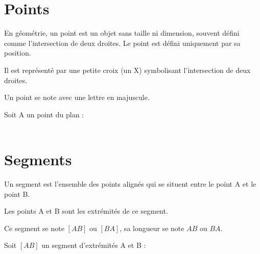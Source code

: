 \documentclass[11pt]{article}
\begin{document}
\section{Points}
\begin{definition}
  En géométrie, un point est un objet sans taille ni dimension, souvent défini comme l'intersection de deux droites. Le point est défini uniquement par sa position.
\end{definition}

\begin{notation}
  \begin{enuspaced}  
  \item Il est représenté par une petite croix (un X) symbolisant
    l'intersection de deux droites.  
  \item Un point se note avec une lettre
    en majuscule.
  \end{enuspaced}
\end{notation}

\begin{exemple}
Soit A un point du plan : \\ \\
\end{exemple}

\section{Segments}

  \begin{definition}
    Un segment est l'ensemble des points alignés qui se situent entre
    le point A et le point B.
  \end{definition}

  \begin{vocabulaire}
    Les points A et B sont les extrémités de ce segment.
  \end{vocabulaire}
  
\begin{notation}
Ce segment se note $[AB]$ ou $[BA]$, sa longueur se note $AB$ ou $BA$.
\end{notation}

\begin{exemple}
  Soit $[AB]$ un segment d'extrémités A et B : \\
      
\end{exemple}
\end{document}
